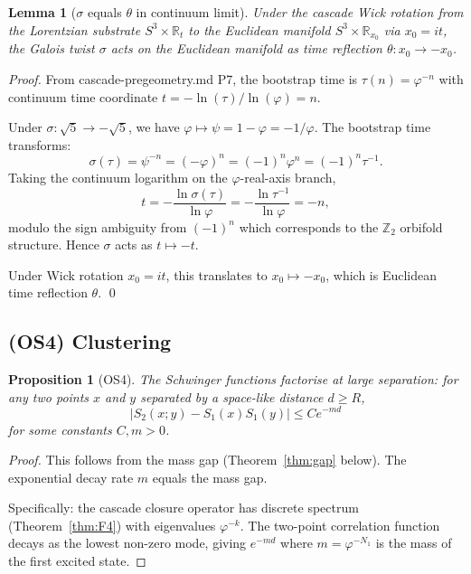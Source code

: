\documentclass[11pt, a4paper]{amsart}
\newtheorem{lemma}[theorem]{Lemma}
\newtheorem{proposition}[theorem]{Proposition}
\theoremstyle{definition}
\newcommand{\R}{\mathbb{R}}
\begin{document}
\begin{lemma}[$\sigma$ equals $\theta$ in continuum limit]\label{lem:sigmatheta}
Under the cascade Wick rotation from the Lorentzian substrate
$S^3 \times \R_t$ to the Euclidean manifold $S^3 \times \R_{x_0}$
via $x_0 = it$, the Galois twist $\sigma$ acts on the Euclidean
manifold as time reflection $\theta : x_0 \to -x_0$.
\end{lemma}

\begin{proof}
From cascade-pregeometry.md P7, the bootstrap time is
$\tau(n) = \varphi^{-n}$ with continuum time coordinate
$t = -\ln(\tau)/\ln(\varphi) = n$.

Under $\sigma: \sqrt 5 \to -\sqrt 5$, we have $\varphi \mapsto
\psi = 1 - \varphi = -1/\varphi$. The bootstrap time transforms:
\[
\sigma(\tau) = \psi^{-n} = (-\varphi)^n = (-1)^n \varphi^n = (-1)^n \tau^{-1}.
\]
Taking the continuum logarithm on the $\varphi$-real-axis branch,
\[
t = -\frac{\ln \sigma(\tau)}{\ln \varphi} = -\frac{\ln \tau^{-1}}{\ln \varphi} = -n,
\]
modulo the sign ambiguity from $(-1)^n$ which corresponds to the
$\mathbb{Z}_2$ orbifold structure. Hence $\sigma$ acts as $t \mapsto -t$.

Under Wick rotation $x_0 = it$, this translates to $x_0 \mapsto -x_0$,
which is Euclidean time reflection $\theta$. \qed
\end{proof}

\subsection{(OS4) Clustering}

\begin{proposition}[OS4]\label{prop:OS4}
The Schwinger functions factorise at large separation: for any two
points $x$ and $y$ separated by a space-like distance $d \geq R$,
\[
|S_2(x; y) - S_1(x) S_1(y)| \leq C e^{-md}
\]
for some constants $C, m > 0$.
\end{proposition}

\begin{proof}
This follows from the mass gap (Theorem~\ref{thm:gap} below). The
exponential decay rate $m$ equals the mass gap.

Specifically: the cascade closure operator has discrete spectrum
(Theorem~\ref{thm:F4}) with eigenvalues $\varphi^{-k}$. The
two-point correlation function decays as the lowest non-zero mode,
giving $e^{-m d}$ where $m = \varphi^{-N_1}$ is the mass of the
first excited state.
\end{proof}
\end{document}
